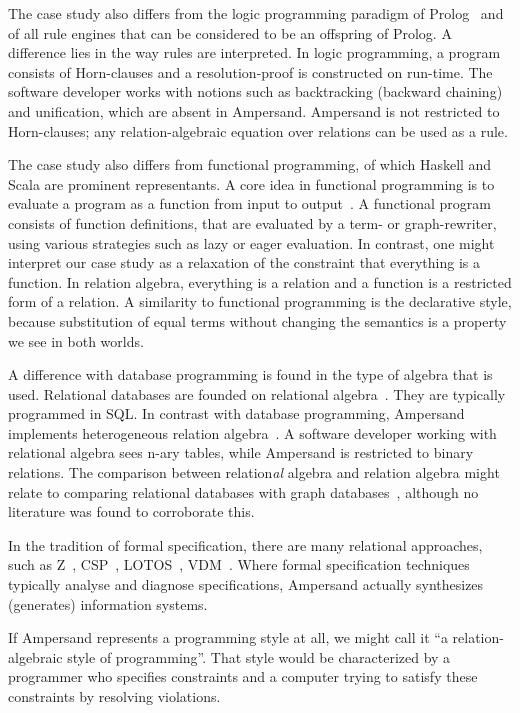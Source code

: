 \documentclass{svproc}
\begin{document}
	The case study also differs from the logic programming paradigm of Prolog~\cite{Lloyd1984} and of all rule engines that can be considered to be an offspring of Prolog.
	A difference lies in the way rules are interpreted.
	In logic programming, a program consists of Horn-clauses and a resolution-proof is constructed on run-time.
	The software developer works with notions such as backtracking (backward chaining) and unification, which are absent in Ampersand.
	Ampersand is not restricted to Horn-clauses; any relation-algebraic equation over relations can be used as a rule.

	The case study also differs from functional programming, of which Haskell and Scala are prominent representants.
	A core idea in functional programming is to evaluate a program as a function from input to output~\cite{Backus1978}.
	A functional program consists of function definitions, that are evaluated by a term- or graph-rewriter, using various strategies such as lazy or eager evaluation.
	In contrast, one might interpret our case study as a relaxation of the constraint that everything is a function.
	In relation algebra, everything is a relation and a function is a restricted form of a relation.
	A similarity to functional programming is the declarative style, because substitution of equal terms without changing the semantics is a property we see in both worlds.

	A difference with database programming is found in the type of algebra that is used.
	Relational databases are founded on relational algebra~\cite{Codd70}. They are typically programmed in SQL.
	In contrast with database programming, Ampersand implements heterogeneous relation algebra~\cite{Schmidt1997}.
	A software developer working with relational algebra sees n-ary tables, while Ampersand is restricted to binary relations.
	The comparison between relation{\it al} algebra and relation algebra might relate to comparing relational databases with graph databases~\cite{Vicknair2010},
	although no literature was found to corroborate this.

	In the tradition of formal specification, there are many relational approaches, such as Z~\cite{Z}, CSP~\cite{CSP}, LOTOS~\cite{LOTOS}, VDM~\cite{VDM}.
	Where formal specification techniques typically analyse and diagnose specifications,
	Ampersand actually synthesizes (generates) information systems.

	If Ampersand represents a programming style at all, we might call it ``a relation-algebraic style of programming''.
	That style would be characterized by a programmer who specifies constraints and a computer trying to satisfy these constraints by resolving violations.
\end{document}
